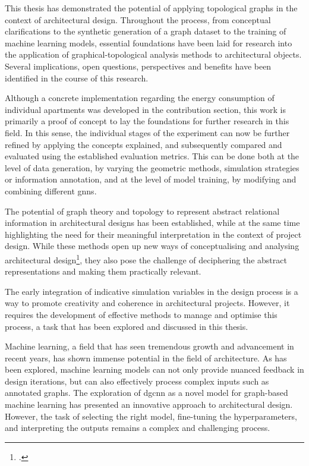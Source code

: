 \documentclass[a4paper, 12pt]{report}
\begin{document}
This thesis has demonstrated the potential of applying topological graphs in the context of architectural design. Throughout the process, from conceptual clarifications to the synthetic generation of a graph dataset to the training of machine learning models, essential foundations have been laid for research into the application of graphical-topological analysis methods to architectural objects. Several implications, open questions, perspectives and benefits have been identified in the course of this research.

Although a concrete implementation regarding the energy consumption of individual apartments was developed in the contribution section, this work is primarily a proof of concept to lay the foundations for further research in this field. In this sense, the individual stages of the experiment can now be further refined by applying the concepts explained, and subsequently compared and evaluated using the established evaluation metrics. This can be done both at the level of data generation, by varying the geometric methods, simulation strategies or information annotation, and at the level of model training, by modifying and combining different \acrlong{gnns}.

The potential of graph theory and topology to represent abstract relational information in architectural designs has been established, while at the same time highlighting the need for their meaningful interpretation in the context of project design. While these methods open up new ways of conceptualising and analysing architectural design\footcites{boguslawski2016two}{nauata2020house}{wang2021room}, they also pose the challenge of deciphering the abstract representations and making them practically relevant.

The early integration of indicative simulation variables in the design process is a way to promote creativity and coherence in architectural projects. However, it requires the development of effective methods to manage and optimise this process, a task that has been explored and discussed in this thesis.

Machine learning, a field that has seen tremendous growth and advancement in recent years, has shown immense potential in the field of architecture. As has been explored, machine learning models can not only provide nuanced feedback in design iterations, but can also effectively process complex inputs such as annotated graphs. The exploration of \acrshort{dgcnn} as a novel model for graph-based machine learning has presented an innovative approach to architectural design. However, the task of selecting the right model, fine-tuning the hyperparameters, and interpreting the outputs remains a complex and challenging process.
\end{document}
